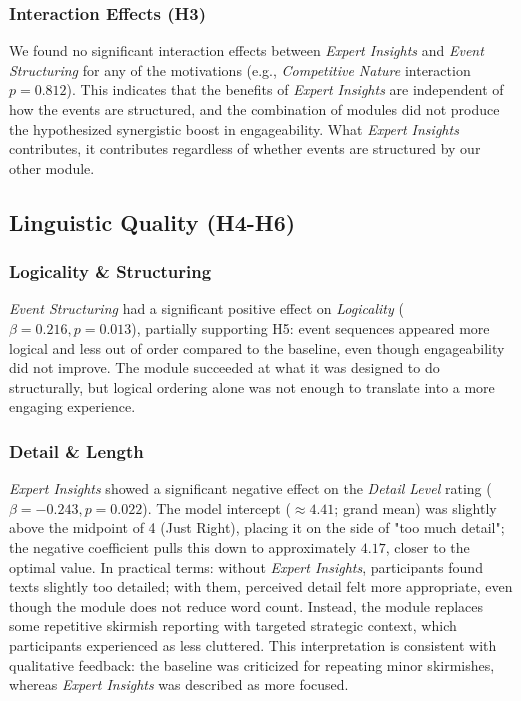 \subsubsection{Interaction Effects (H3)}
We found no significant interaction effects between \textit{Expert Insights} and \textit{Event Structuring} for any of the motivations (e.g., \textit{Competitive Nature} interaction $p=0.812$). This indicates that the benefits of \textit{Expert Insights} are independent of how the events are structured, and the combination of modules did not produce the hypothesized synergistic boost in engageability. What \textit{Expert Insights} contributes, it contributes regardless of whether events are structured by our other module.

\subsection{Linguistic Quality (H4-H6)}
\subsubsection{Logicality \& Structuring}
\textit{Event Structuring} had a significant positive effect on \textit{Logicality} ($\beta=0.216, p=0.013$), partially supporting H5: event sequences appeared more logical and less out of order compared to the baseline, even though engageability did not improve. The module succeeded at what it was designed to do structurally, but logical ordering alone was not enough to translate into a more engaging experience.

\subsubsection{Detail \& Length}
\textit{Expert Insights} showed a significant negative effect on the \textit{Detail Level} rating ($\beta=-0.243, p=0.022$). The model intercept ($\approx 4.41$; grand mean) was slightly above the midpoint of 4 (Just Right), placing it on the side of "too much detail"; the negative coefficient pulls this down to approximately $4.17$, closer to the optimal value. In practical terms: without \textit{Expert Insights}, participants found texts slightly too detailed; with them, perceived detail felt more appropriate, even though the module does not reduce word count. Instead, the module replaces some repetitive skirmish reporting with targeted strategic context, which participants experienced as less cluttered. This interpretation is consistent with qualitative feedback: the baseline was criticized for repeating minor skirmishes, whereas \textit{Expert Insights} was described as more focused.

